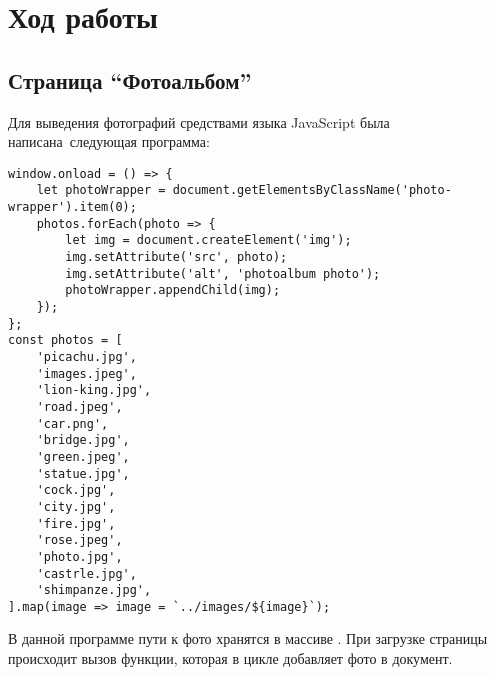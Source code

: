 \documentclass[a4paper,14pt]{extarticle}
\begin{document}
\section{Ход работы}
\subsection{Страница \enquote{Фотоальбом}}
Для выведения фотографий средствами языка JavaScript была написана\
следующая программа:
\begin{lstlisting}
window.onload = () => {
    let photoWrapper = document.getElementsByClassName('photo-wrapper').item(0);
    photos.forEach(photo => {
        let img = document.createElement('img');
        img.setAttribute('src', photo);
        img.setAttribute('alt', 'photoalbum photo');
        photoWrapper.appendChild(img);
    });
};
const photos = [
    'picachu.jpg',
    'images.jpeg',
    'lion-king.jpg',
    'road.jpeg',
    'car.png',
    'bridge.jpg',
    'green.jpeg',
    'statue.jpg',
    'cock.jpg',
    'city.jpg',
    'fire.jpg',
    'rose.jpeg',
    'photo.jpg',
    'castrle.jpg',
    'shimpanze.jpg',
].map(image => image = `../images/${image}`);
\end{lstlisting}

В данной программе пути к фото хранятся в массиве .
При загрузке страницы происходит вызов функции, которая в цикле
добавляет фото в документ.
\end{document}
